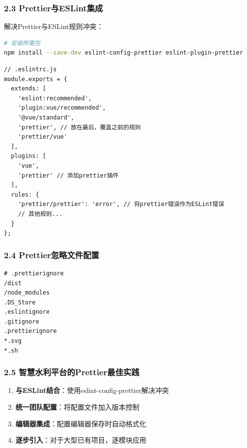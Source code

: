 \subsubsection{2.3
Prettier与ESLint集成}\label{prettierux4e0eeslintux96c6ux6210}

解决Prettier与ESLint规则冲突：

\begin{lstlisting}[language=bash]
# 安装所需包
npm install --save-dev eslint-config-prettier eslint-plugin-prettier
\end{lstlisting}

\begin{lstlisting}
// .eslintrc.js
module.exports = {
  extends: [
    'eslint:recommended',
    'plugin:vue/recommended',
    '@vue/standard',
    'prettier', // 放在最后，覆盖之前的规则
    'prettier/vue'
  ],
  plugins: [
    'vue',
    'prettier' // 添加prettier插件
  ],
  rules: {
    'prettier/prettier': 'error', // 将prettier错误作为ESLint错误
    // 其他规则...
  }
};
\end{lstlisting}

\subsubsection{2.4
Prettier忽略文件配置}\label{prettierux5ffdux7565ux6587ux4ef6ux914dux7f6e}

\begin{lstlisting}
# .prettierignore
/dist
/node_modules
.DS_Store
.eslintignore
.gitignore
.prettierignore
*.svg
*.sh
\end{lstlisting}

\subsubsection{2.5
智慧水利平台的Prettier最佳实践}\label{ux667aux6167ux6c34ux5229ux5e73ux53f0ux7684prettierux6700ux4f73ux5b9eux8df5}

\begin{enumerate}
\def\labelenumi{\arabic{enumi}.}
\tightlist
\item
  \textbf{与ESLint结合}：使用eslint-config-prettier解决冲突
\item
  \textbf{统一团队配置}：将配置文件加入版本控制
\item
  \textbf{编辑器集成}：配置编辑器保存时自动格式化
\item
  \textbf{逐步引入}：对于大型已有项目，逐模块应用
\end{enumerate}

